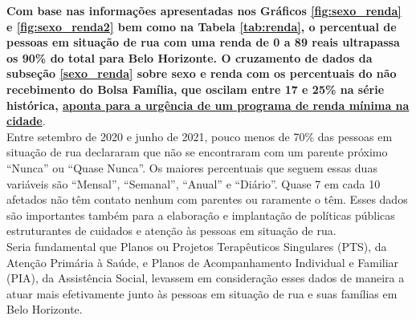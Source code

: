 \documentclass[12pt]{article}
\begin{document}
\textbf{Com base nas informações apresentadas nos Gráficos \ref{fig:sexo_renda} e \ref{fig:sexo_renda2} bem como na Tabela \ref{tab:renda}, o percentual de pessoas em situação de rua com uma renda de 0 a 89 reais ultrapassa os 90\% do total para Belo Horizonte. O cruzamento de dados da subseção \ref{sexo_renda} sobre sexo e renda com os percentuais do não recebimento do Bolsa Família, que oscilam entre 17 e 25\% na série histórica, \underline{aponta para a urgência de um programa de renda mínima na cidade}}.\\ 

Entre setembro de 2020 e junho de 2021, pouco menos de 70\% das pessoas em situação de rua declararam que não se encontraram com um parente próximo ``Nunca” ou ``Quase Nunca”. Os maiores percentuais que seguem essas duas variáveis são ``Mensal”, ``Semanal”, ``Anual” e ``Diário”. Quase 7 em cada 10 afetados não têm contato nenhum com parentes ou raramente o têm. Esses dados são importantes também para a elaboração e implantação de políticas públicas estruturantes de cuidados e atenção às pessoas em situação de rua.\\ 

Seria fundamental que Planos ou Projetos Terapêuticos Singulares (PTS), da Atenção Primária à Saúde, e Planos de Acompanhamento Individual e Familiar (PIA), da Assistência Social, levassem em consideração esses dados de maneira a atuar mais efetivamente junto às pessoas em situação de rua e suas famílias em Belo Horizonte.
\end{document}
